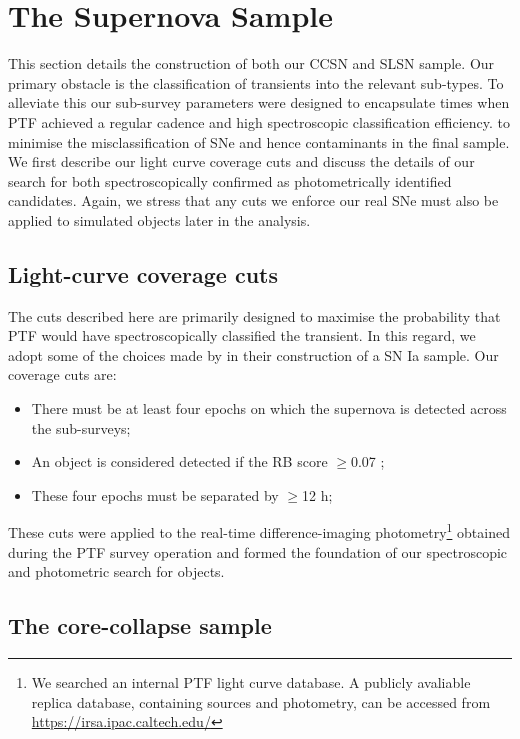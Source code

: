 \documentclass[a4paper,fleqn,usenatbib]{mnras}
\begin{document}
\section{The Supernova Sample}

This section details the construction of both our CCSN and SLSN sample. Our primary obstacle is the classification of transients into the relevant sub-types. To alleviate this our sub-survey parameters were designed to encapsulate times when PTF achieved a regular cadence and high spectroscopic classification efficiency.  to minimise the misclassification of SNe and hence contaminants in the final sample. We first describe our light curve coverage cuts and discuss the details of our search for both spectroscopically confirmed as photometrically identified candidates. Again, we stress that any cuts we enforce our real SNe must also be applied to simulated objects later in the analysis.

\subsection{Light-curve coverage cuts}
\label{sec:coverage_cuts}

The cuts described here are primarily designed to maximise the probability that PTF would have spectroscopically classified the transient. In this regard, we adopt some of the choices made by \citet{Frohmaier19} in their construction of a SN Ia sample. Our coverage cuts are:

\begin{itemize}
    \item There must be at least four epochs on which the supernova is detected across the sub-surveys;
    \item An object is considered detected if the RB score $\ge$0.07 \citep{Bloom2012};
    \item These four epochs must be separated by $\ge$12 h;
\end{itemize}

These cuts were applied to  the real-time difference-imaging photometry\footnote{We searched an internal PTF light curve database. A publicly avaliable replica database, containing sources and photometry, can be accessed from \url{https://irsa.ipac.caltech.edu/} } obtained during the PTF survey operation and formed the foundation of our spectroscopic and photometric search for objects.

\subsection{The core-collapse sample}
\label{sec:CCSample}
\end{document}
